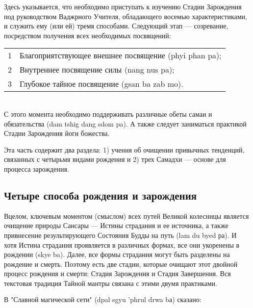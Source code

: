 Здесь указывается, что необходимо приступать к изучению Стадии Зарождения под
руководством Ваджрного Учителя, обладающего восемью характеристиками, и служить ему
(или ей) тремя способами. Следующий этап — созревание, посредством получения всех
необходимых посвящений:\\

\begin{tabular}{ll}
1 & Благоприятствующее внешнее посвящение (phyi phan pa);\\
2 & Внутреннее посвящение силы (nang nus pa);\\
3 & Глубокое тайное посвящение (gsan ba zab mo).
\end{tabular}\\

С этого момента необходимо поддерживать различные обеты самаи и обязательства
(dam tshig dang sdom pa). А также следует заниматься практикой Стадии Зарождения йоги
божества.\\

\begin{siderules}
Эта часть содержит два раздела:
1) учения об очищении привычных тенденций, связанных с четырьмя видами рождения и
2) трех Самадхи — основе для процесса зарождения.
\end{siderules}

\subsection{Четыре способа рождения и зарождения}

\begin{siderules}
Вцелом, ключевым моментом (смыслом) всех путей Великой колесницы является очищение
природы Сансары — Истины страдания и ее источника, а также привнесение
результирующего Состояния Будды на путь (lam du byed ра). И хотя Истина страдания
проявляется в различных формах, все они укоренены в рождении (skye ba).
Далее, все формы страдания могут быть разделены на рождение и смерть.
Поэтому есть две стадии, которые очищают этот двойной процесс рождения и смерти:
Стадия Зарождения и Стадия Завершения. Вся текстовая традиция Тайной мантры
связана с этими двумя практиками.
\end{siderules}

В "Славной магической сети" (dpal sgyu 'phrul drwa bа) сказано:


